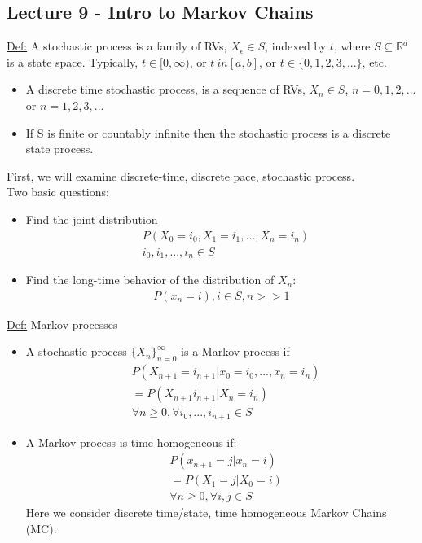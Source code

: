 \documentclass[12pt, letterpaper]{article}
\begin{document}
\subsection{Lecture 9 - Intro to Markov Chains}
\underline{Def:} A stochastic process is a family of RVs, $X_\epsilon \in S$, 
indexed by $t$, where $S \subseteq \mathbb{R}^d$ is a state space. Typically, 
$t \in [0,\infty)$, or $t \ in [a,b]$, or $t\in\{0,1,2,3,...\}$, etc.
\begin{itemize}
    \item A discrete time stochastic process, is a sequence of RVs, $X_n \in S$,
        $n = 0,1,2,...$ or $n = 1,2,3,...$
    \item If S is finite or countably infinite then the stochastic process is a 
        discrete state process.
\end{itemize}
First, we will examine discrete-time, discrete pace, stochastic process. \\
Two basic questions:
\begin{itemize}
    \item Find the joint distribution
    \begin{align*}
        &P(X_0 = i_0, X_1 = i_1, ..., X_n = i_n) \\
        &i_0, i_1, ..., i_n \in S
    \end{align*}
    \item Find the long-time behavior of the distribution of $X_n$:
    \begin{align*}
        P(x_n = i), i\in S, n>>1
    \end{align*}
\end{itemize}

\noindent \underline{Def:} Markov processes
\begin{itemize}
    \item A stochastic process $\{X_n\}^\infty_{n=0}$ is a Markov process if 
    \begin{align*}
        &P(X_{n + 1} = i_{n+1} | x_0 = i_0, ..., x_n = i_n) \\
        &= P(X_{n+1} i_{n+1} | X_n = i_n) \\
        & \forall n\ge 0, \forall i_0, ..., i_{n+1} \in S
    \end{align*}
    \item A Markov process is time homogeneous if: 
    \begin{align*}
        &P(x_{n+1} = j | x_n = i) \\ 
        &= P(X_1 = j | X_0 = i) \\
        &\forall n\ge 0, \forall i,j \in S
    \end{align*}
    Here we consider discrete time/state, time homogeneous Markov Chains (MC).
\end{itemize}
\end{document}

